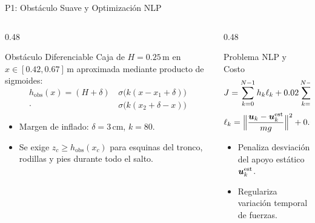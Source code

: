 \begin{frame}{P1: Obstáculo Suave y Optimización NLP}
\begin{columns}[T]
\begin{column}{0.48\textwidth}
\begin{tbox}{Obstáculo Diferenciable}
\small
Caja de $H=0.25$\,m en $x \in [0.42, 0.67]$\,m aproximada mediante producto de sigmoides:
\begin{equation*}
\begin{aligned}
h_{\mathrm{obs}}(x) = (H+\delta)\,&\sigma\big(k(x-x_1+\delta)\big)\\
\cdot\,&\sigma\big(k(x_2+\delta-x)\big)
\end{aligned}
\end{equation*}
\begin{itemize}
\item Margen de inflado: $\delta = 3$\,cm, $k=80$.
\item Se exige $z_c \ge h_{\mathrm{obs}}(x_c)$ para esquinas del tronco, rodillas y pies durante todo el salto.
\end{itemize}
\end{tbox}
\end{column}

\begin{column}{0.48\textwidth}
\begin{tbox}{Problema NLP y Costo}
\small
\begin{equation*}
J = \sum_{k=0}^{N-1} h_k \ell_k + 0.02 \sum_{k=1}^{N-1} \Big\|\frac{\Delta \bm{u}_k}{mg}\Big\|^2
\end{equation*}
\begin{equation*}
\ell_k = \Big\|\frac{\bm{u}_k - \bm{u}_k^{\mathrm{est}}}{mg}\Big\|^2 + 0.05\|{}^b\bm{\omega}_k\|^2 + 2(\phi_k^2 + \psi_k^2)
\end{equation*}
\begin{itemize}
\item Penaliza desviación del apoyo estático $\bm{u}_k^{\mathrm{est}}$.
\item Regulariza variación temporal de fuerzas.
\end{itemize}
\end{tbox}
\end{column}
\end{columns}
\end{frame}

